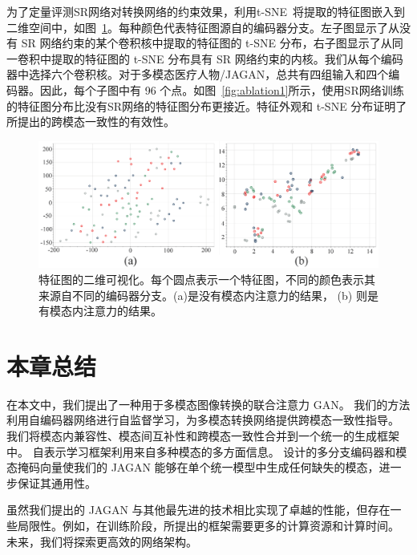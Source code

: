 为了定量评测SR网络对转换网络的约束效果，利用t-SNE~\cite{maaten2008visualizing}将提取的特征图嵌入到二维空间中，如图~\ref{fig:regression}。每种颜色代表特征图源自的编码器分支。左子图显示了从没有 SR 网络约束的某个卷积核中提取的特征图的 t-SNE 分布，右子图显示了从同一卷积中提取的特征图的 t-SNE 分布具有 SR 网络约束的内核。我们从每个编码器中选择六个卷积核。对于多模态医疗人物/JAGAN，总共有四组输入和四个编码器。因此，每个子图中有 96 个点。如图~\ref{fig:ablation1}所示，使用SR网络训练的特征图分布比没有SR网络的特征图分布更接近。特征外观和 t-SNE 分布证明了所提出的跨模态一致性的有效性。

\begin{figure}
    \includegraphics[width=1\columnwidth]{figures/JAGAN/regression.png}
	\caption{特征图的二维可视化。每个圆点表示一个特征图，不同的颜色表示其来源自不同的编码器分支。(a)是没有模态内注意力的结果， (b) 则是有模态内注意力的结果。}
	\label{fig:regression}
\end{figure}


\section{本章总结}

在本文中，我们提出了一种用于多模态图像转换的联合注意力 GAN。 我们的方法利用自编码器网络进行自监督学习，为多模态转换网络提供跨模态一致性指导。 我们将模态内兼容性、模态间互补性和跨模态一致性合并到一个统一的生成框架中。
自表示学习框架利用来自多种模态的多方面信息。 设计的多分支编码器和模态掩码向量使我们的 JAGAN 能够在单个统一模型中生成任何缺失的模态，进一步保证其通用性。

虽然我们提出的 JAGAN 与其他最先进的技术相比实现了卓越的性能，但存在一些局限性。例如，在训练阶段，所提出的框架需要更多的计算资源和计算时间。 未来，我们将探索更高效的网络架构。
